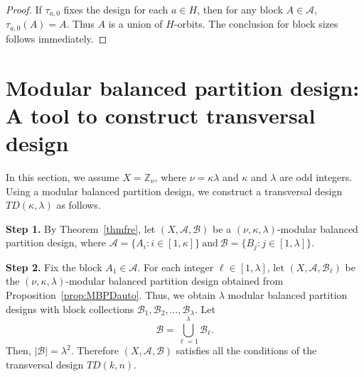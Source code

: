 \documentclass[preprint,11pt]{elsarticle}
\newcommand{\MBPD}{\textnormal{MBPD}}
\newtheorem{definition}[theorem]{Definition}
\begin{document}
\begin{proof}
If $\tau_{a,0}$ fixes the design for each $a\in H$, then for any block $A\in\mathcal A$,
\(
\tau_{a,0}(A)=A.
\)
Thus $A$ is a union of $H$-orbits.  
The conclusion for block sizes follows immediately.
\end{proof}




 \section{Modular balanced partition design: A tool to construct transversal design} 
In this section, we assume $X=\mathbb{Z}_{\nu}$, where $\nu=\kappa\lambda$ and
$\kappa$ and $\lambda$ are odd integers. Using a modular balanced partition
design, we construct a transversal design $TD(\kappa,\lambda)$ as follows.

\medskip

\noindent\textbf{Step 1.}
By Theorem~\ref{thmfre}, let
$(X,\mathcal A,\mathcal B)$ be a
$(\nu,\kappa,\lambda)$-modular balanced partition design, where
\(
\mathcal A=\{A_i:i\in[1,\kappa]\}
~\text{and}~
\mathcal B=\{B_j:j\in[1,\lambda]\}.
\)

\medskip

\noindent\textbf{Step 2.}
Fix the block $A_1\in\mathcal A$. For each integer
$\ell\in[1,\lambda]$, let
\(
(X,\mathcal A,\mathcal B_\ell)
\)
be the $(\nu,\kappa,\lambda)$-modular balanced partition design obtained from
Proposition~\ref{prop:MBPDauto}. Thus, we obtain $\lambda$ modular balanced
partition designs with block collections
\(
\mathcal B_1,\mathcal B_2,\ldots,\mathcal B_\lambda.
\)
\noindent Let
\[
\mathscr B=\bigcup_{\ell=1}^{\lambda}\mathcal B_\ell.
\]
\noindent Then,
\(
|\mathscr B|=\lambda^2.
\) Therefore $(X,\mathcal{A},\mathscr {B})$ satisfies all the conditions of the transversal design $TD(k,n)$.
   
\end{document}
